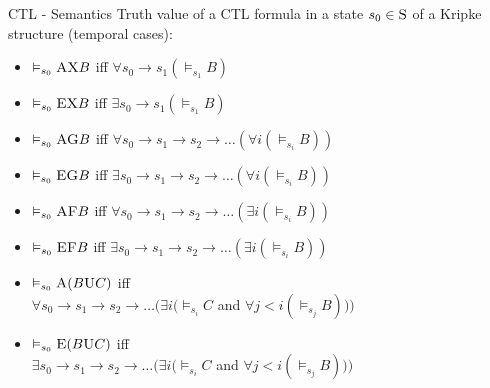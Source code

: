 \documentclass{beamer}
\begin{document}
\begin{frame}{CTL - Semantics}
    Truth value of a CTL formula in a state $s_0 \in \textsc{S}$ of a Kripke structure (temporal cases):
    \medskip
    \begin{itemize}
        \item $\vDash_{s_0} \textsc{AX}B$ \hspace{2em} iff \hspace{2em} $\forall s_0 \to s_1 (\vDash_{s_1} B)$
        \item $\vDash_{s_0} \textsc{EX}B$ \hspace{2em} iff \hspace{2em} $\exists s_0 \to s_1 (\vDash_{s_1} B)$\smallskip

        \item $\vDash_{s_0} \textsc{AG}B$ \hspace{2em} iff \hspace{2em} $\forall s_0 \to s_1 \to s_2 \to \dots (\forall i (\vDash_{s_i} B))$
        \item $\vDash_{s_0} \textsc{EG}B$ \hspace{2em} iff \hspace{2em} $\exists s_0 \to s_1 \to s_2 \to \dots (\forall i (\vDash_{s_i} B))$\smallskip

        \item $\vDash_{s_0} \textsc{AF}B$ \hspace{2em} iff \hspace{2em} $\forall s_0 \to s_1 \to s_2 \to \dots (\exists i (\vDash_{s_i} B))$
        \item $\vDash_{s_0} \textsc{EF}B$ \hspace{2em} iff \hspace{2em} $\exists s_0 \to s_1 \to s_2 \to \dots (\exists i (\vDash_{s_i} B))$\smallskip

        \item $\vDash_{s_0} \textsc{A}(B\textsc{U}C)$ \hspace{2em} iff \\\hspace{2em}$\forall s_0 \to s_1 \to s_2 \to \dots (\exists i (\vDash_{s_i} C $ and $ \forall j < i (\vDash_{s_j} B)))$
        \item $\vDash_{s_0} \textsc{E}(B\textsc{U}C)$ \hspace{2em} iff \\\hspace{2em}$\exists s_0 \to s_1 \to s_2 \to \dots (\exists i (\vDash_{s_i} C $ and $ \forall j < i (\vDash_{s_j} B)))$
    \end{itemize}
\end{frame}
\end{document}
